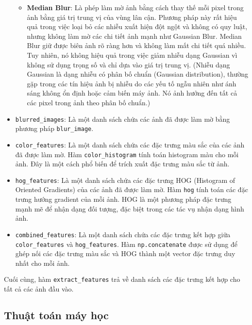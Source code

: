 \documentclass[a4paper,12pt]{article}
\begin{document}
\begin{itemize}
\begin{itemize}
        \item \textbf{Median Blur}: Là phép làm mờ ảnh bằng cách thay thế mỗi pixel trong ảnh bằng giá trị trung vị của vùng lân cận. Phương pháp này rất hiệu quả trong việc loại bỏ các nhiễu xuất hiện đột ngột và không có quy luật, nhưng không làm mờ các chi tiết ảnh mạnh như Gaussian Blur. Median Blur giữ được biên ảnh rõ ràng hơn và không làm mất chi tiết quá nhiều. Tuy nhiên, nó không hiệu quả trong việc giảm nhiễu dạng Gaussian vì không sử dụng trọng số và chỉ dựa vào giá trị trung vị. (Nhiễu dạng Gaussian là dạng nhiễu có phân bố chuẩn (Gaussian distribution), thường gặp trong các tín hiệu ảnh bị nhiễu do các yếu tố ngẫu nhiên như ánh sáng không ổn định hoặc cảm biến máy ảnh. Nó ảnh hưởng đến tất cả các pixel trong ảnh theo phân bố chuẩn.)
    \end{itemize}
    
    \item \texttt{blurred\_images}: Là một danh sách chứa các ảnh đã được làm mờ bằng phương pháp \texttt{blur\_image}.
    
    \item \texttt{color\_features}: Là một danh sách chứa các đặc trưng màu sắc của các ảnh đã được làm mờ. Hàm \texttt{color\_histogram} tính toán histogram màu cho mỗi ảnh. Đây là một cách phổ biến để trích xuất đặc trưng màu sắc từ ảnh.
    
    \item \texttt{hog\_features}: Là một danh sách chứa các đặc trưng HOG (Histogram of Oriented Gradients) của các ảnh đã được làm mờ. Hàm \texttt{hog} tính toán các đặc trưng hướng gradient của mỗi ảnh. HOG là một phương pháp đặc trưng mạnh mẽ để nhận dạng đối tượng, đặc biệt trong các tác vụ nhận dạng hình ảnh.
    
    \item \texttt{combined\_features}: Là một danh sách chứa các đặc trưng kết hợp giữa \texttt{color\_features} và \texttt{hog\_features}. Hàm \texttt{np.concatenate} được sử dụng để ghép nối các đặc trưng màu sắc và HOG thành một vector đặc trưng duy nhất cho mỗi ảnh.
\end{itemize}

\noindent Cuối cùng, hàm \texttt{extract\_features} trả về danh sách các đặc trưng kết hợp cho tất cả các ảnh đầu vào.

\subsection{Thuật toán máy học}
\end{document}
